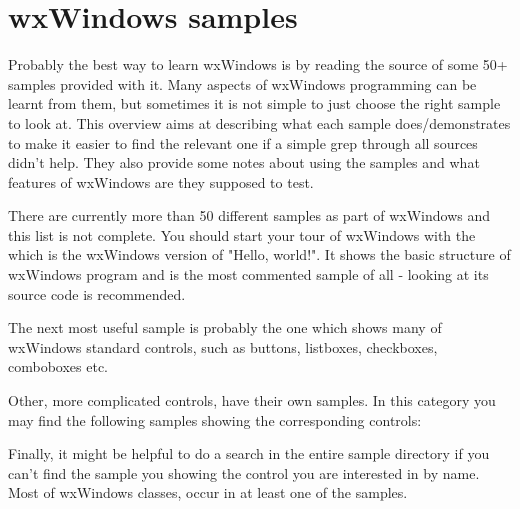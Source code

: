 
\section{wxWindows samples}\label{samples}

Probably the best way to learn wxWindows is by reading the source of some 50+
samples provided with it. Many aspects of wxWindows programming can be learnt
from them, but sometimes it is not simple to just choose the right sample to
look at. This overview aims at describing what each sample does/demonstrates to
make it easier to find the relevant one if a simple grep through all sources
didn't help. They also provide some notes about using the samples and what
features of wxWindows are they supposed to test.

There are currently more than 50 different samples as part of wxWindows and
this list is not complete. You should start your tour of wxWindows with the 
 which is the wxWindows version of
"Hello, world!". It shows the basic structure of wxWindows program and is the
most commented sample of all - looking at its source code is recommended.

The next most useful sample is probably the  
one which shows many of wxWindows standard controls, such as buttons,
listboxes, checkboxes, comboboxes etc.

Other, more complicated controls, have their own samples. In this category you
may find the following samples showing the corresponding controls:

\begin{twocollist}\itemsep=0pt
\end{twocollist}

Finally, it might be helpful to do a search in the entire sample directory if
you can't find the sample you showing the control you are interested in by
name. Most of wxWindows classes, occur in at least one of the samples.


